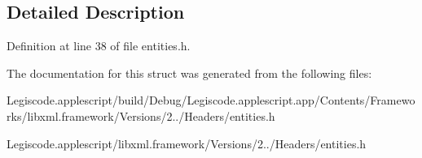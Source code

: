 \subsection{Detailed Description}


Definition at line 38 of file entities.\-h.



The documentation for this struct was generated from the following files\-:\begin{DoxyCompactItemize}
\item 
Legiscode.\-applescript/build/\-Debug/\-Legiscode.\-applescript.\-app/\-Contents/\-Frameworks/libxml.\-framework/\-Versions/2../\-Headers/entities.\-h\item 
Legiscode.\-applescript/libxml.\-framework/\-Versions/2../\-Headers/entities.\-h\end{DoxyCompactItemize}
